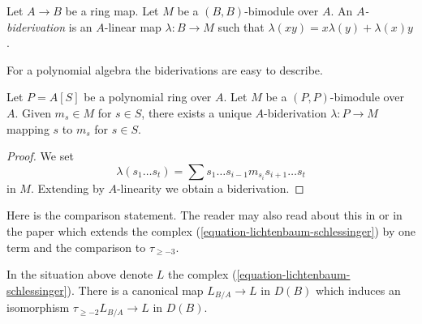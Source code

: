 \begin{definition}
\label{definition-biderivation}
Let $A \to B$ be a ring map. Let $M$ be a $(B, B)$-bimodule
over $A$. An {\it $A$-biderivation} is an $A$-linear map $\lambda : B \to M$
such that $\lambda(xy) = x\lambda(y) + \lambda(x)y$.
\end{definition}

\noindent
For a polynomial algebra the biderivations are easy to describe.

\begin{lemma}
\label{lemma-polynomial-ring-unique}
Let $P = A[S]$ be a polynomial ring over $A$. Let $M$ be a $(P, P)$-bimodule
over $A$. Given $m_s \in M$ for $s \in S$, there exists a unique
$A$-biderivation $\lambda : P \to M$ mapping $s$ to $m_s$ for $s \in S$.
\end{lemma}

\begin{proof}
We set
$$
\lambda(s_1 \ldots s_t) =
\sum s_1 \ldots s_{i - 1} m_{s_i} s_{i + 1} \ldots s_t
$$
in $M$. Extending by $A$-linearity we obtain a biderivation.
\end{proof}

\noindent
Here is the comparison statement. The reader may also read about this
in \cite[page 206, Proposition 12]{Andre-Homologie} or in the paper
\cite{Doncel} which extends the complex
(\ref{equation-lichtenbaum-schlessinger}) by one term and the comparison
to $\tau_{\geq -3}$.

\begin{lemma}
\label{lemma-compare-higher}
In the situation above denote $L$ the complex
(\ref{equation-lichtenbaum-schlessinger}).
There is a canonical map $L_{B/A} \to L$ in $D(B)$ which
induces an isomorphism $\tau_{\geq -2}L_{B/A} \to L$ in $D(B)$.
\end{lemma}

